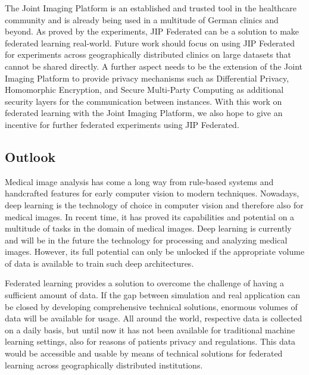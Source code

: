 The Joint Imaging Platform is an established and trusted tool in the healthcare community and is already being used in a multitude of German clinics and beyond.
As proved by the experiments, JIP Federated can be a solution to make federated learning real-world.
Future work should focus on using JIP Federated for experiments across  geographically distributed clinics on large datasets that cannot be shared directly.
A further aspect needs to be the extension of the Joint Imaging Platform to provide privacy mechanisms such as Differential Privacy, Homomorphic Encryption, and Secure Multi-Party Computing as additional security layers for the communication between instances.
With this work on federated learning with the Joint Imaging Platform, we also hope to give an incentive for further federated experiments using JIP Federated.

\subsection{Outlook}
\label{subsec:Outlook}

Medical image analysis has come a long way from rule-based systems and handcrafted features for early computer vision to modern techniques. Nowadays, deep learning is the technology of choice in computer vision and therefore also for medical images. In recent time, it has proved its capabilities and potential on a multitude of tasks in the domain of medical images. Deep learning is currently and will be in the future the technology for processing and analyzing medical images. However, its full potential can only be unlocked if the appropriate volume of data is available to train such deep architectures.

Federated learning provides a solution to overcome the challenge of having a sufficient amount of data. If the gap between simulation and real application can be closed by developing comprehensive technical solutions, enormous volumes of data will be available for usage. All around the world, respective data is collected on a daily basis, but until now it has not been available for traditional machine learning settings, also for reasons of patients privacy and regulations. This data would be accessible and usable by means of technical solutions for federated learning across geographically distributed institutions.

